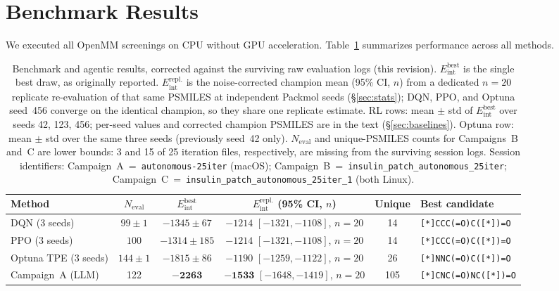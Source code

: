 \documentclass[twocolumn]{fairmeta}
\begin{document}
\section{Benchmark Results}
\label{sec:results}

We executed all OpenMM screenings on CPU without GPU acceleration.
Table~\ref{tab:benchmarks} summarizes performance across all methods.

\begin{table}[t]
\centering
\caption{Benchmark and agentic results, corrected against the surviving raw evaluation logs (this revision).
$E_\text{int}^\text{best}$ is the single best draw, as originally reported.
$E_\text{int}^\text{repl.}$ is the noise-corrected champion mean (95\% CI, $n$) from a dedicated $n{=}20$ replicate re-evaluation of that same PSMILES at independent Packmol seeds (\S\ref{sec:stats}); DQN, PPO, and Optuna seed~456 converge on the identical champion, so they share one replicate estimate.
RL rows: mean $\pm$ std of $E_\text{int}^\text{best}$ over seeds 42, 123, 456; per-seed values and corrected champion PSMILES are in the text (\S\ref{sec:baselines}).
Optuna row: mean $\pm$ std over the same three seeds (previously seed~42 only).
$N_\text{eval}$ and unique-PSMILES counts for Campaigns~B and~C are lower bounds: 3 and 15 of 25 iteration files, respectively, are missing from the surviving session logs.
Session identifiers: Campaign~A~=~\texttt{autonomous-25iter} (macOS); Campaign~B~=~\texttt{insulin\_patch\_autonomous\_25iter}; Campaign~C~=~\texttt{insulin\_patch\_autonomous\_25iter\_1} (both Linux).}
\label{tab:benchmarks}
\footnotesize
\begin{tabular}{lccccl}
\toprule
\textbf{Method} & \textbf{$N_\text{eval}$} & \textbf{$E_\text{int}^\text{best}$} & \textbf{$E_\text{int}^\text{repl.}$ (95\% CI, $n$)} & \textbf{Unique} & \textbf{Best candidate} \\
\midrule
DQN (3 seeds)   & $99 \pm 1$  & $-1345 \pm 67$   & $-1214$ $[-1321,-1108]$, $n{=}20$ & 14 & \texttt{[*]CCC(=O)C([*])=O} \\
PPO (3 seeds)   & $100$       & $-1314 \pm 185$  & $-1214$ $[-1321,-1108]$, $n{=}20$ & 14 & \texttt{[*]CCC(=O)C([*])=O} \\
Optuna TPE (3 seeds) & $144 \pm 1$ & $-1815 \pm 86$ & $-1190$ $[-1259,-1122]$, $n{=}20$ & 26 & \texttt{[*]NNC(=O)C([*])=O} \\
Campaign~A (LLM)   & 122        & $\mathbf{-2263}$ & $\mathbf{-1533}$ $[-1648,-1419]$, $n{=}20$ & 105 & \texttt{[*]CNC(=O)NC([*])=O} \\

\end{tabular}
\end{table}
\end{document}
